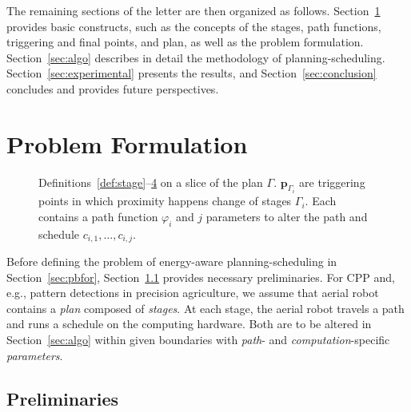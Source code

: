 \documentclass[letterpaper,10pt,journal,twoside]{IEEEtran}
\newcommand{\figpath}{./figures}
\theoremstyle{definition}
\begin{document}
The remaining sections of the letter are then organized as follows. Section~\ref{sec:prob} provides basic constructs, such as the concepts of the stages, path functions, triggering and final points, and plan, as well as the problem formulation. Section~\ref{sec:algo} describes in detail the methodology of planning-scheduling. Section~\ref{sec:experimental} presents the results, %
and Section~\ref{sec:conclusion} concludes and provides future perspectives. %

\vspace*{-1ex}
\section{Problem Formulation}  %
\label{sec:prob}               %
\begin{figure}[t]
  \footnotesize
  \begin{minipage}[l]{0.35\columnwidth}
    \caption{Definitions~\ref{def:stage}--\hyperref[def:plan]{4} on a slice of the plan $\Gamma$. $\mathbf{p}_{\Gamma_i}$ are triggering points in which proximity happens change of stages $\Gamma_i$. Each contains a path function $\varphi_i$ and $j$ parameters to alter the path and schedule $c_{i,1},\dots,c_{i,j}$.}
    \label{fig:traj1}
  \end{minipage}\hfill
  \begin{minipage}[c]{0.6\columnwidth}
    \centering
    \vspace*{-4.5ex}
    
  \end{minipage}
  \vspace*{-4.5ex}
\end{figure}

Before defining the problem of energy-aware planning-scheduling in Section~\ref{sec:pbfor}, Section~\ref{sec:prelim} provides necessary preliminaries. For CPP and, e.g., pattern detections in precision agriculture, we assume that aerial robot contains a \emph{plan} composed of \emph{stages}. At each stage, the aerial robot travels a path and runs a schedule on the computing hardware. Both are to be altered in Section~\ref{sec:algo} within given boundaries with \emph{path}- and \emph{computation}-specific \emph{parameters}.%

\vspace*{-2ex}
\subsection{Preliminaries}
\label{sec:prelim}
\end{document}
